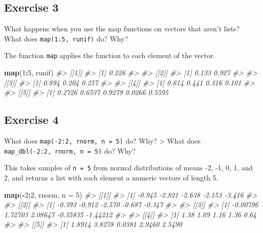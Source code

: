 \documentclass[]{book}
\newenvironment{Shaded}{\begin{snugshade}}{\end{snugshade}}
\newcommand{\CommentTok}[1]{\textcolor[rgb]{0.56,0.35,0.01}{\textit{#1}}}
\newcommand{\DataTypeTok}[1]{\textcolor[rgb]{0.13,0.29,0.53}{#1}}
\newcommand{\DecValTok}[1]{\textcolor[rgb]{0.00,0.00,0.81}{#1}}
\newcommand{\KeywordTok}[1]{\textcolor[rgb]{0.13,0.29,0.53}{\textbf{#1}}}
\newcommand{\NormalTok}[1]{#1}
\newcommand{\OperatorTok}[1]{\textcolor[rgb]{0.81,0.36,0.00}{\textbf{#1}}}
\theoremstyle{definition}
\theoremstyle{definition}
\theoremstyle{definition}
\theoremstyle{remark}
\begin{document}
\hypertarget{exercise-3-40}{%
\subsection{Exercise 3}\label{exercise-3-40}}

What happens when you use the map functions on vectors that aren't
lists? What does \texttt{map(1:5,\ runif)} do? Why?

The function \texttt{map} applies the function to each element of the
vector.

\begin{Shaded}
\begin{Highlighting}[]
\KeywordTok{map}\NormalTok{(}\DecValTok{1}\OperatorTok{:}\DecValTok{5}\NormalTok{, runif)}
\CommentTok{#> [[1]]}
\CommentTok{#> [1] 0.226}
\CommentTok{#> }
\CommentTok{#> [[2]]}
\CommentTok{#> [1] 0.133 0.927}
\CommentTok{#> }
\CommentTok{#> [[3]]}
\CommentTok{#> [1] 0.894 0.204 0.257}
\CommentTok{#> }
\CommentTok{#> [[4]]}
\CommentTok{#> [1] 0.614 0.441 0.316 0.101}
\CommentTok{#> }
\CommentTok{#> [[5]]}
\CommentTok{#> [1] 0.2726 0.6537 0.9279 0.0266 0.5595}
\end{Highlighting}
\end{Shaded}

\hypertarget{exercise-4-32}{%
\subsection{Exercise 4}\label{exercise-4-32}}

What does \texttt{map(-2:2,\ rnorm,\ n\ =\ 5)} do? Why? \textgreater{}
What does \texttt{map\_dbl(-2:2,\ rnorm,\ n\ =\ 5)} do? Why?

This takes samples of \texttt{n\ =\ 5} from normal distributions of
means -2, -1, 0, 1, and 2, and returns a list with each element a
numeric vectors of length 5.

\begin{Shaded}
\begin{Highlighting}[]
\KeywordTok{map}\NormalTok{(}\OperatorTok{-}\DecValTok{2}\OperatorTok{:}\DecValTok{2}\NormalTok{, rnorm, }\DataTypeTok{n =} \DecValTok{5}\NormalTok{)}
\CommentTok{#> [[1]]}
\CommentTok{#> [1] -0.945 -2.821 -2.638 -2.153 -3.416}
\CommentTok{#> }
\CommentTok{#> [[2]]}
\CommentTok{#> [1] -0.393 -0.912 -2.570 -0.687 -0.347}
\CommentTok{#> }
\CommentTok{#> [[3]]}
\CommentTok{#> [1] -0.00796  1.72703  2.08647 -0.35835 -1.44212}
\CommentTok{#> }
\CommentTok{#> [[4]]}
\CommentTok{#> [1] 1.38 1.09 1.16 1.36 0.64}
\CommentTok{#> }
\CommentTok{#> [[5]]}
\CommentTok{#> [1] 1.8914 3.8278 0.0381 2.9460 2.5490}
\end{Highlighting}
\end{Shaded}
\end{document}
